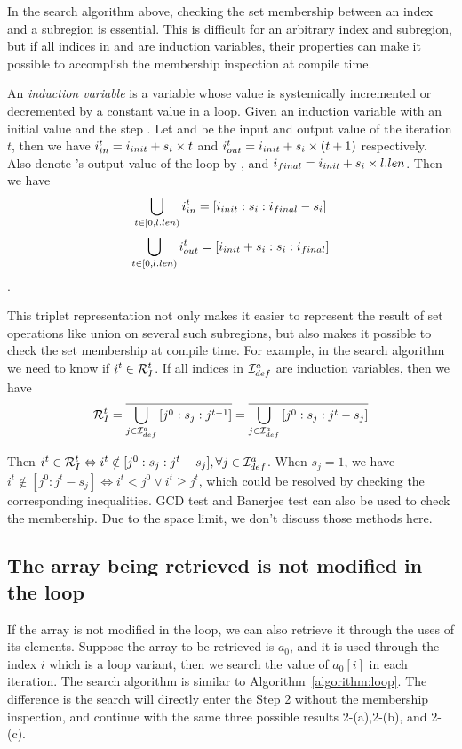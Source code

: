 In the search algorithm above, checking the set membership between an index and a subregion is essential. 
This is difficult for an arbitrary index and subregion, but if all indices in \Iuse and \Idef are induction variables, their properties can make it possible to accomplish the membership inspection  at compile time.

An \emph{induction variable} \cite{Wolfe1992} is a variable whose value is systemically incremented or decremented by a constant value in a loop.
Given an induction variable \IndVar with an initial value \IndVarInit and the step \IndVarStep.
Let \IndVarInput and \IndVarOutput be the input and output value of the iteration $t$, then we have $i_{in}^t=i_{init}+s_i\times t$ and $i_{out}^t=i_{init}+s_i\times (t+1)$ respectively.
Also denote \IndVar's output value of the loop  by \IndVarFinal, and $i_{final}=i_{init}+s_i\times l.len$.
Then we have $$\bigcup_{t\in[0,l.len)}{i_{in}^t}=[i_{init}:s_i:i_{final}-s_i]$$$$\bigcup_{t\in[0,l.len)}{i_{out}^t}=[i_{init}+s_i:s_i:i_{final}]$$.

This triplet representation not only makes it easier to represent the result of set operations like union on several such subregions, but also makes it possible to check the set membership at compile time.
%
For example, in the search algorithm we need to know if $i^t\in \mathcal{R}^t_{I}$. 
If all indices in $\mathcal{I}^a_{def}$ are induction variables, then we have
$$\Ra%
=\overline{\bigcup_{j\in \Idef}{[j^0:s_j:j^{t-1}]}}=\overline{\bigcup_{j\in \Idef}{[j^0:s_j:j^t-s_j]}}$$

Then $i^t\in \mathcal{R}^t_{I} \Leftrightarrow  i^t\notin[j^0:s_j:j^t-s_j], \forall j\in \mathcal{I}^a_{def}$.
When $s_j=1$, we have $i^t\notin[j^0:j^t-s_j] \Leftrightarrow i^t < j^0 \vee i^t \ge j^t$, which could be resolved by checking the corresponding inequalities.
GCD test and Banerjee test can also be used to check the membership. 
Due to the space limit, we don't  discuss those methods here. 


\subsection{The array being retrieved is not modified in the loop}
\label{subsec:onlyuse}

If the array is not modified in the loop, we can also retrieve it through the uses of its elements.
Suppose the array to be retrieved is $a_0$, and it is used through the index $i$ which is a loop variant, then we search the value of $a_0[i]$ in each iteration. 
The search algorithm is similar to Algorithm~\ref{algorithm:loop}.
The difference is the search will directly enter the Step 2 without the membership inspection, and continue with the same three possible results 2-(a),2-(b), and 2-(c).

